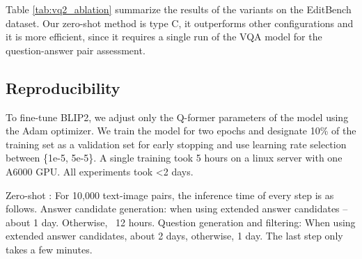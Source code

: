 \documentclass{article}
\begin{document}
Table \ref{tab:vq2_ablation} summarize the results of the  variants on the EditBench dataset. Our zero-shot  method is  type C, it outperforms other configurations and it is more efficient, since it requires a single run of the VQA model for the question-answer pair assessment.

\begin{table}[!h]
\centering
\caption{Comparing  configurations on all EditBench categories}
\label{tab:vq2_ablation}
\end{table}

\subsection{Reproducibility}
\label{sec:reproducibility}
To fine-tune BLIP2, we adjust only the Q-former parameters of the model using the Adam optimizer. We train the model for two epochs and designate 10\% of the training set as a validation set for early stopping and use learning rate selection between \{1e-5, 5e-5\}. A single training took 5 hours on a linux server with one A6000 GPU. All experiments took <2 days.

Zero-shot : For 10,000 text-image pairs, the inference time of every step is as follows.
Answer candidate generation: when using extended answer candidates -- about 1 day. Otherwise, ~12 hours.
Question generation and filtering: When using extended answer candidates, about 2 days, otherwise, 1 day.
The last step only takes a few minutes.


 
\end{document}
